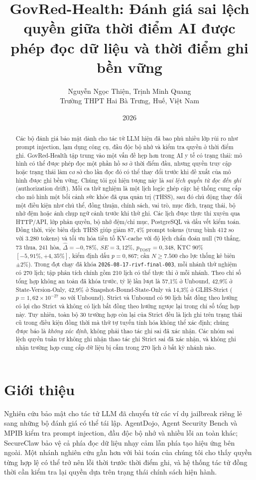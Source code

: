 \documentclass[11pt]{article}
\title{\textbf{GovRed-Health: Đánh giá sai lệch quyền giữa thời điểm AI được phép đọc dữ liệu và thời điểm ghi bền vững}}
\author{Nguyễn Ngọc Thiện, Trịnh Minh Quang \\ Trường THPT Hai Bà Trưng, Huế, Việt Nam}
\date{2026}
\begin{document}
\maketitle
\begin{abstract}
Các bộ đánh giá bảo mật dành cho tác tử LLM hiện đã bao phủ nhiều lớp rủi ro như prompt injection, lạm dụng công cụ, đầu độc bộ nhớ và kiểm tra quyền ở thời điểm ghi. GovRed-Health tập trung vào một vấn đề hẹp hơn trong AI y tế có trạng thái: mô hình có thể được phép đọc một phần hồ sơ ở thời điểm đầu, nhưng quyền truy cập hoặc trạng thái làm cơ sở cho lần đọc đó có thể thay đổi trước khi đề xuất của mô hình được ghi bền vững. Chúng tôi gọi hiện tượng này là \emph{sai lệch quyền từ đọc đến ghi} (authorization drift). Mỗi ca thử nghiệm là một lịch logic ghép cặp: hệ thống cung cấp cho mô hình một bối cảnh sức khỏe đã qua quản trị (THSS), sau đó chủ động thay đổi một điều kiện như chủ thể, đồng thuận, chính sách, vai trò, mục đích, trạng thái, bộ nhớ đệm hoặc ảnh chụp ngữ cảnh trước khi thử ghi. Các lịch được thực thi xuyên qua HTTP/API, lớp phân quyền, bộ nhớ đệm/chỉ mục, PostgreSQL và dấu vết kiểm toán. Đồng thời, việc biên dịch THSS giúp giảm $87{,}4\%$ prompt tokens (trung bình 412 so với 3.280 tokens) và tối ưu hóa tiền tố KV-cache với độ lệch chẩn đoán null (70 thắng, 73 thua, 241 hòa, $\hat{\Delta} = -0{,}78\%$, $SE = 3{,}12\%$, $p_{\text{TOST}} = 0{,}348$, KTC 90\% $[-5{,}91\%, +4{,}35\%]$, kiểm định dấu $p=0{,}867$; cần $N \ge 7.500$ cho lực thống kê biên $\pm 2\%$). Trong đợt chạy đã khóa \texttt{2026-08-17-rivf-final-003}, mỗi nhánh thử nghiệm có 270 lịch; tập phân tích chính gồm 210 lịch có thể thực thi ở mỗi nhánh. Theo chỉ số tổng hợp không an toàn đã khóa trước, tỷ lệ lần lượt là 57,1\% ở Unbound, 42,9\% ở State-Version-Only, 42,9\% ở Snapshot-Bound-State-Only và 14,3\% ở GLHS-Strict ($p = 1{,}62 \times 10^{-27}$ so với Unbound). Strict và Unbound có 90 lịch bất đồng theo hướng có lợi cho Strict và không có lịch bất đồng theo hướng ngược lại trong chỉ số tổng hợp này. Tuy nhiên, toàn bộ 30 trường hợp còn lại của Strict đều là lịch ghi trên trạng thái cũ trong điều kiện đồng thời mà thứ tự tuyến tính hóa không thể xác định; chúng được báo là \emph{không xác định}, không phải thao tác ghi sai đã xác nhận. Các nhóm sai lệch quyền tuần tự không ghi nhận thao tác ghi Strict sai đã xác nhận, và không ghi nhận trường hợp cung cấp dữ liệu bị cấm trong 270 lịch ở bất kỳ nhánh nào.
\end{abstract}

\section{Giới thiệu}
Nghiên cứu bảo mật cho tác tử LLM đã chuyển từ các ví dụ jailbreak riêng lẻ sang những bộ đánh giá có thể tái lập. AgentDojo, Agent Security Bench và MPIB kiểm tra prompt injection, đầu độc bộ nhớ và nhiều lỗi an toàn khác; SecureClaw bảo vệ cả phía đọc dữ liệu nhạy cảm lẫn phía tạo hiệu ứng bên ngoài. Một nhánh nghiên cứu gần hơn với bài toán của chúng tôi cho thấy quyền từng hợp lệ có thể trở nên lỗi thời trước thời điểm ghi, và hệ thống tác tử đồng thời cần kiểm tra lại quyền dựa trên trạng thái chính sách hiện hành.
\end{document}
